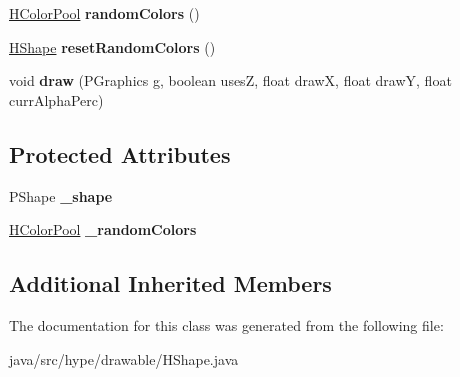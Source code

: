 \begin{DoxyCompactItemize}
\item 
\hypertarget{classhype_1_1drawable_1_1_h_shape_aa4a0712785805aa2775257996a70eac6}{\hyperlink{classhype_1_1colorist_1_1_h_color_pool}{H\-Color\-Pool} {\bfseries random\-Colors} ()}\label{classhype_1_1drawable_1_1_h_shape_aa4a0712785805aa2775257996a70eac6}

\item 
\hypertarget{classhype_1_1drawable_1_1_h_shape_aae1e34b239b134035a1f0ec05e35a7b7}{\hyperlink{classhype_1_1drawable_1_1_h_shape}{H\-Shape} {\bfseries reset\-Random\-Colors} ()}\label{classhype_1_1drawable_1_1_h_shape_aae1e34b239b134035a1f0ec05e35a7b7}

\item 
\hypertarget{classhype_1_1drawable_1_1_h_shape_a2e207a27d2bc0d50dff148baba559ee7}{void {\bfseries draw} (P\-Graphics g, boolean uses\-Z, float draw\-X, float draw\-Y, float curr\-Alpha\-Perc)}\label{classhype_1_1drawable_1_1_h_shape_a2e207a27d2bc0d50dff148baba559ee7}

\end{DoxyCompactItemize}
\subsection*{Protected Attributes}
\begin{DoxyCompactItemize}
\item 
\hypertarget{classhype_1_1drawable_1_1_h_shape_ac2a70c1f4682dad262d45a9e71438e5c}{P\-Shape {\bfseries \-\_\-shape}}\label{classhype_1_1drawable_1_1_h_shape_ac2a70c1f4682dad262d45a9e71438e5c}

\item 
\hypertarget{classhype_1_1drawable_1_1_h_shape_a7962441789cf8714456a573fc448ec56}{\hyperlink{classhype_1_1colorist_1_1_h_color_pool}{H\-Color\-Pool} {\bfseries \-\_\-random\-Colors}}\label{classhype_1_1drawable_1_1_h_shape_a7962441789cf8714456a573fc448ec56}

\end{DoxyCompactItemize}
\subsection*{Additional Inherited Members}


The documentation for this class was generated from the following file\-:\begin{DoxyCompactItemize}
\item 
java/src/hype/drawable/H\-Shape.\-java\end{DoxyCompactItemize}
